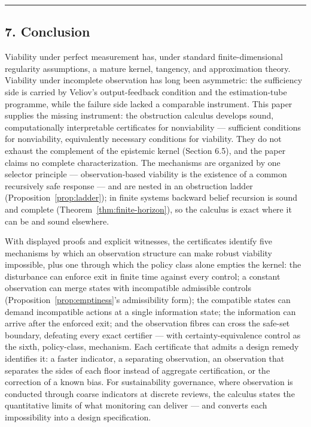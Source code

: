 \documentclass[11pt]{article}
\theoremstyle{definition}
\begin{document}
\begin{center}\rule{0.5\linewidth}{0.5pt}\end{center}

\subsection{7. Conclusion}\label{conclusion}

Viability under perfect measurement has, under standard
finite-dimensional regularity assumptions, a mature kernel, tangency,
and approximation theory. Viability under incomplete observation has
long been asymmetric: the sufficiency side is carried by Veliov's
output-feedback condition and the estimation-tube programme, while the
failure side lacked a comparable instrument. This paper supplies the missing instrument: the obstruction calculus develops sound, computationally interpretable certificates for nonviability --- sufficient conditions for nonviability, equivalently necessary conditions for viability. They do not exhaust the complement of the epistemic kernel (Section 6.5), and the paper claims no complete characterization. The mechanisms
are organized by one selector principle --- observation-based viability
is the existence of a common recursively safe response --- and are
nested in an obstruction ladder (Proposition~\ref{prop:ladder}); in
finite systems backward belief recursion is sound and complete
(Theorem~\ref{thm:finite-horizon}), so the calculus is exact where it
can be and sound elsewhere.

With displayed proofs and explicit witnesses, the certificates identify
five mechanisms by which an observation structure can make robust
viability impossible, plus one through which the policy class alone
empties the kernel: the disturbance can enforce exit in finite time
against every control; a constant observation can merge states with
incompatible admissible controls (Proposition~\ref{prop:emptiness}'s admissibility form);
the compatible states can demand incompatible actions at a single
information state; the information can arrive after the enforced exit;
and the observation fibres can cross the safe-set boundary, defeating
every exact certifier --- with certainty-equivalence control as the
sixth, policy-class, mechanism. Each certificate that admits a design
remedy identifies it: a faster indicator, a separating observation, an
observation that separates the sides of each floor instead of aggregate
certification, or the correction of a known bias. For sustainability
governance, where observation is conducted through coarse indicators at
discrete reviews, the calculus states the quantitative limits of what
monitoring can deliver --- and converts each impossibility into a design
specification.
\end{document}

